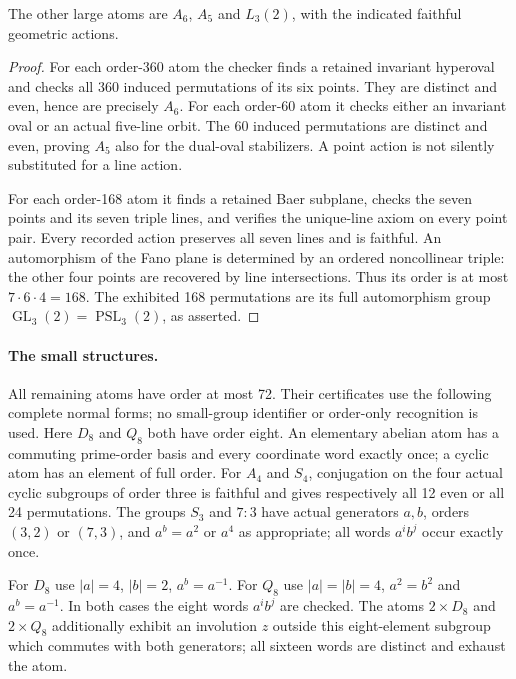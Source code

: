 \documentclass[11pt]{article}
\newcommand{\PSL}{\operatorname{PSL}}\newcommand{\SL}{\operatorname{SL}}\newcommand{\GL}{\operatorname{GL}}
\begin{document}
\begin{lemma}\label{geometric}
The other large atoms are $A_6$, $A_5$ and $L_3(2)$, with the indicated
faithful geometric actions.
\end{lemma}
\begin{proof}
For each order-360 atom the checker finds a retained invariant hyperoval
and checks all 360 induced permutations of its six points. They are
distinct and even, hence are precisely $A_6$.
For each order-60 atom it checks either an invariant oval or an actual
five-line orbit. The 60 induced permutations are distinct and even,
proving $A_5$ also for the dual-oval stabilizers. A point action is not
silently substituted for a line action.

For each order-168 atom it finds a retained Baer subplane, checks the
seven points and its seven triple lines, and verifies the unique-line
axiom on every point pair. Every recorded action preserves all seven
lines and is faithful. An automorphism of the Fano plane is determined
by an ordered noncollinear triple: the other four points are recovered
by line intersections. Thus its order is at most $7\cdot6\cdot4=168$.
The exhibited 168 permutations are its full automorphism group
$\GL_3(2)=\PSL_3(2)$, as asserted.
\end{proof}

\paragraph{The small structures.}
All remaining atoms have order at most 72. Their certificates use the
following complete normal forms; no small-group identifier or order-only
recognition is used. Here $D_8$ and $Q_8$ both have order eight.
An elementary abelian atom has a commuting prime-order basis and every
coordinate word exactly once; a cyclic atom has an element of full order.
For $A_4$ and $S_4$, conjugation on the four actual cyclic subgroups of
order three is faithful and gives respectively all 12 even or all 24
permutations. The groups $S_3$ and $7:3$ have actual generators $a,b$,
orders $(3,2)$ or $(7,3)$, and $a^b=a^2$ or $a^4$ as appropriate;
all words $a^ib^j$ occur exactly once.

For $D_8$ use $|a|=4$, $|b|=2$, $a^b=a^{-1}$.
For $Q_8$ use $|a|=|b|=4$, $a^2=b^2$ and $a^b=a^{-1}$.
In both cases the eight words $a^ib^j$ are checked.
The atoms $2\times D_8$ and $2\times Q_8$ additionally exhibit an
involution $z$ outside this eight-element subgroup which commutes with
both generators; all sixteen words are distinct and exhaust the atom.
\end{document}
